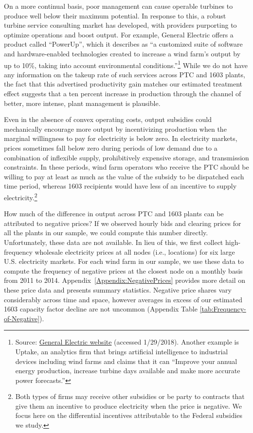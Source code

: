 \documentclass[12pt]{article}
\begin{document}
On a more continual basis, poor management can cause operable turbines to produce well below their maximum potential. In response to this, a robust turbine service consulting market has developed, with providers purporting to optimize operations and boost output. For example, General Electric offers a product called ``PowerUp'', which it describes as ``a customized suite of software and hardware-enabled technologies created to increase a wind farm's output by up to 10\%, taking into account environmental conditions.''\footnote{Source: \href{https://www.gerenewableenergy.com/wind-energy/turbine-services/platform-upgrades}{General Electric website} (accessed 1/29/2018). Another example is Uptake, an analytics firm that brings artificial intelligence to industrial devices including wind farms and claims that it can ``Improve your annual energy production, increase turbine days available and make more accurate power forecasts.''} While we do not have any information on the takeup rate of such services across PTC and 1603 plants, the fact that this advertised productivity gain matches our estimated treatment effect suggests that a ten percent increase in production through the channel of better, more intense, plant management is plausible.

Even in the absence of convex operating costs, output subsidies could mechanically encourage more output by incentivizing production when the marginal willingness to pay for electricity is below zero. In electricity markets, prices sometimes fall below zero during periods of low demand due to a combination of inflexible supply, prohibitively expensive storage, and transmission constraints. In these periods, wind farm operators who receive the PTC should be willing to pay at least as much as the value of the subsidy to be dispatched each time period, whereas 1603 recipients would have less of an incentive to supply electricity.\footnote{Both types of firms may receive other subsidies or be party to contracts that give them an incentive to produce electricity when the price is negative. We focus here on the differential incentives attributable to the Federal subsidies we study.}

How much of the difference in output across PTC and 1603 plants can be attributed to negative prices? If we observed hourly bids and clearing prices for all the plants in our sample, we could compute this number directly. Unfortunately, these data are not available. In lieu of this, we first collect high-frequency wholesale electricity prices at all nodes (i.e., locations) for six large U.S. electricity markets. For each wind farm in our sample, we use these data to compute the frequency of negative prices at the closest node on a monthly basis from 2011 to 2014. Appendix~\ref{Appendix:NegativePrices} provides more detail on these price data and presents summary statistics. Negative price shares vary considerably across time and space, however averages in excess of our estimated 1603 capacity factor decline are not uncommon (Appendix Table \ref{tab:Frequency-of-Negative}). 
\end{document}
